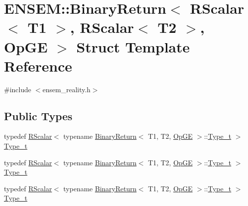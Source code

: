 \hypertarget{structENSEM_1_1BinaryReturn_3_01RScalar_3_01T1_01_4_00_01RScalar_3_01T2_01_4_00_01OpGE_01_4}{}\section{E\+N\+S\+EM\+:\+:Binary\+Return$<$ R\+Scalar$<$ T1 $>$, R\+Scalar$<$ T2 $>$, Op\+GE $>$ Struct Template Reference}
\label{structENSEM_1_1BinaryReturn_3_01RScalar_3_01T1_01_4_00_01RScalar_3_01T2_01_4_00_01OpGE_01_4}


{\ttfamily \#include $<$ensem\+\_\+reality.\+h$>$}

\subsection*{Public Types}
\begin{DoxyCompactItemize}
\item 
typedef \mbox{\hyperlink{classENSEM_1_1RScalar}{R\+Scalar}}$<$ typename \mbox{\hyperlink{structENSEM_1_1BinaryReturn}{Binary\+Return}}$<$ T1, T2, \mbox{\hyperlink{structENSEM_1_1OpGE}{Op\+GE}} $>$\+::\mbox{\hyperlink{structENSEM_1_1BinaryReturn_3_01RScalar_3_01T1_01_4_00_01RScalar_3_01T2_01_4_00_01OpGE_01_4_a1b28f948b115f04d8d97d69e3f4a74c7}{Type\+\_\+t}} $>$ \mbox{\hyperlink{structENSEM_1_1BinaryReturn_3_01RScalar_3_01T1_01_4_00_01RScalar_3_01T2_01_4_00_01OpGE_01_4_a1b28f948b115f04d8d97d69e3f4a74c7}{Type\+\_\+t}}
\item 
typedef \mbox{\hyperlink{classENSEM_1_1RScalar}{R\+Scalar}}$<$ typename \mbox{\hyperlink{structENSEM_1_1BinaryReturn}{Binary\+Return}}$<$ T1, T2, \mbox{\hyperlink{structENSEM_1_1OpGE}{Op\+GE}} $>$\+::\mbox{\hyperlink{structENSEM_1_1BinaryReturn_3_01RScalar_3_01T1_01_4_00_01RScalar_3_01T2_01_4_00_01OpGE_01_4_a1b28f948b115f04d8d97d69e3f4a74c7}{Type\+\_\+t}} $>$ \mbox{\hyperlink{structENSEM_1_1BinaryReturn_3_01RScalar_3_01T1_01_4_00_01RScalar_3_01T2_01_4_00_01OpGE_01_4_a1b28f948b115f04d8d97d69e3f4a74c7}{Type\+\_\+t}}
\item 
typedef \mbox{\hyperlink{classENSEM_1_1RScalar}{R\+Scalar}}$<$ typename \mbox{\hyperlink{structENSEM_1_1BinaryReturn}{Binary\+Return}}$<$ T1, T2, \mbox{\hyperlink{structENSEM_1_1OpGE}{Op\+GE}} $>$\+::\mbox{\hyperlink{structENSEM_1_1BinaryReturn_3_01RScalar_3_01T1_01_4_00_01RScalar_3_01T2_01_4_00_01OpGE_01_4_a1b28f948b115f04d8d97d69e3f4a74c7}{Type\+\_\+t}} $>$ \mbox{\hyperlink{structENSEM_1_1BinaryReturn_3_01RScalar_3_01T1_01_4_00_01RScalar_3_01T2_01_4_00_01OpGE_01_4_a1b28f948b115f04d8d97d69e3f4a74c7}{Type\+\_\+t}}
\end{DoxyCompactItemize}


